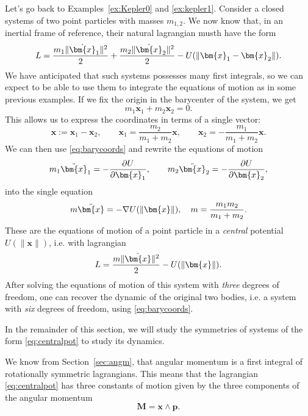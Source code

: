 \documentclass[english,fontsize=11pt,paper=a5,oneside]{scrbook}
\newcommand{\bx}{\bm{x}}
\newcommand{\bp}{\bm{p}}
\theoremstyle{definition}
\newenvironment{example}
  {\pushQED{\qed}\renewcommand{\qedsymbol}{$\lozenge$}\examplex}
  {\popQED\endexamplex}
\begin{document}
\begin{example}[The two-body problem]\label{ex:kepler2}
Let's go back to Examples~\ref{ex:Kepler0} and \ref{ex:kepler1}.
Consider a closed systems of two point particles with masses $m_{1,2}$.
We now know that, in an inertial frame of reference, their natural lagrangian musth have the form
\begin{equation}
    L = \frac{m_1 \|\dot\bx_1\|^2}{2} + \frac{m_2 \|\dot\bx_2\|^2}{2} - U(\|\bx_1 - \bx_2\|).
\end{equation}
We have anticipated that such systems possesses many first integrals, so we can expect to be able to use them to integrate the equations of motion as in some previous examples.
If we fix the origin in the barycenter of the system, we get
\begin{equation}
    m_1 \bx_1 + m_2 \bx_2 = 0.
\end{equation}
This allows us to express the coordinates in terms of a single vector:
\begin{equation}\label{eq:barycoords}
    \bx := \bx_1 - \bx_2, \qquad
    \bx_1 = \frac{m_2}{m_1 + m_2} \bx, \qquad
    \bx_2 = -\frac{m_1}{m_1 + m_2} \bx.
\end{equation}
We can then use \eqref{eq:barycoords} and rewrite the equations of motion
\begin{equation}
    m_1 \ddot \bx_1 = -\frac{\partial U}{\partial \bx_1}, \qquad m_2 \ddot \bx_2 = -\frac{\partial U}{\partial \bx_2},
\end{equation}
into the single equation
\begin{equation}
    m \ddot \bx = -\nabla U(\|\bx\|), \quad m = \frac{m_1m_2}{m_1+m_2}.
\end{equation}
These are the equations of motion of a point particle in a \emph{central} potential $U(\|\bx\|)$, i.e. with lagrangian
\begin{equation}\label{eq:centralpot}
    L = \frac{m \|\dot\bx\|^2}{2} - U(\|\bx\|).
\end{equation}
After solving the equations of motion of this system with \emph{three} degrees of freedom, one can recover the dynamic of the original two bodies, i.e. a system with \emph{six} degrees of freedom, using \eqref{eq:barycoords}.
\end{example}

In the remainder of this section, we will study the symmetries of systems of the form \eqref{eq:centralpot} to study its dynamics.

We know from Section~\ref{sec:angm}, that angular momentum is a first integral of rotationally symmetric lagrangians.
This means that the lagrangian \eqref{eq:centralpot} has three constants of motion given by the three components of the angular momentum
\begin{equation}
    \bm{M} = \bx\wedge \bp.
\end{equation}
\end{document}
